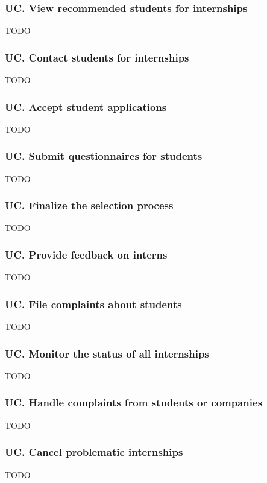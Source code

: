\subsubsection*{UC\cuc . View recommended students for internships}
TODO

\subsubsection*{UC\cuc . Contact students for internships}
TODO

\subsubsection*{UC\cuc . Accept student applications}
TODO

\subsubsection*{UC\cuc . Submit questionnaires for students}
TODO

\subsubsection*{UC\cuc . Finalize the selection process}
TODO

\subsubsection*{UC\cuc . Provide feedback on interns}
TODO

\subsubsection*{UC\cuc . File complaints about students}
TODO

\subsubsection*{UC\cuc . Monitor the status of all internships}
TODO

\subsubsection*{UC\cuc . Handle complaints from students or companies}
TODO

\subsubsection*{UC\cuc . Cancel problematic internships}
TODO

